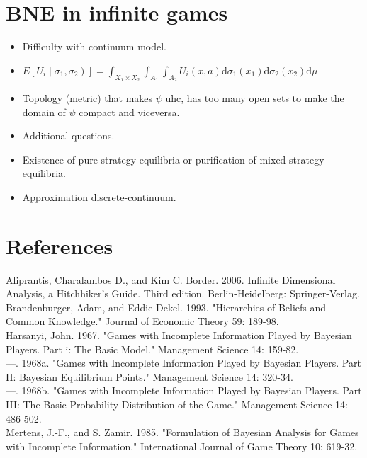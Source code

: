 \documentclass[10pt]{article}
\begin{document}
\section*{BNE in infinite games}
\begin{itemize}
  \item Difficulty with continuum model.
  \item $\left.E\left[U_{i} \mid \sigma_{1}, \sigma_{2}\right)\right]=\int_{X_{1} \times X_{2}} \int_{A_{1}} \int_{A_{2}} U_{i}(x, a) \mathrm{d} \sigma_{1}\left(x_{1}\right) \mathrm{d} \sigma_{2}\left(x_{2}\right) \mathrm{d} \mu$
  \item Topology (metric) that makes $\psi$ uhc, has too many open sets to make the domain of $\psi$ compact and viceversa.
  \item Additional questions.
  \item Existence of pure strategy equilibria or purification of mixed strategy equilibria.
  \item Approximation discrete-continuum.
\end{itemize}

\section*{References}
Aliprantis, Charalambos D., and Kim C. Border. 2006. Infinite Dimensional Analysis, a Hitchhiker's Guide. Third edition. Berlin-Heidelberg: Springer-Verlag.\\
Brandenburger, Adam, and Eddie Dekel. 1993. "Hierarchies of Beliefs and Common Knowledge." Journal of Economic Theory 59: 189-98.\\
Harsanyi, John. 1967. "Games with Incomplete Information Played by Bayesian Players. Part i: The Basic Model." Management Science 14: 159-82.\\
---. 1968a. "Games with Incomplete Information Played by Bayesian Players. Part II: Bayesian Equilibrium Points." Management Science 14: 320-34.\\
---. 1968b. "Games with Incomplete Information Played by Bayesian Players. Part III: The Basic Probability Distribution of the Game." Management Science 14: 486-502.\\
Mertens, J.-F., and S. Zamir. 1985. "Formulation of Bayesian Analysis for Games with Incomplete Information." International Journal of Game Theory 10: 619-32.
\end{document}
